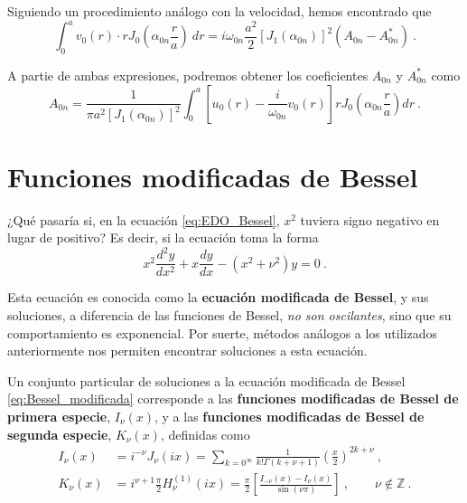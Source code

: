 \begin{ejemplo}
    Siguiendo un procedimiento análogo con la velocidad, hemos encontrado que
    \begin{equation*}
        \int_0^a v_0(r) \cdot r J_0\left( \alpha_{0n} \frac{r}{a} \right) \ dr = i \omega_{0n} \frac{a^2}{2} [J_1(\alpha_{0n})]^2 (A_{0n} - A^\ast_{0n}) \ .
    \end{equation*}

    A partie de ambas expresiones, podremos obtener los coeficientes $A_{0n}$ y $A^\ast_{0n}$ como
    \begin{equation*}
        A_{0n} = \frac{1}{\pi a^2 [J_1(\alpha_{0n})]^2} \int_0^a \left[ u_0(r) - \dfrac{i}{\omega_{0n}} v_0(r) \right] r J_0\left( \alpha_{0n} \frac{r}{a} \right) dr \ .
    \end{equation*}

\end{ejemplo}

\section{Funciones modificadas de Bessel}

¿Qué pasaría si, en la ecuación \eqref{eq:EDO_Bessel}, $x^2$ tuviera signo negativo en lugar de positivo? Es decir, si la ecuación toma la forma
\begin{equation}\label{eq:Bessel_modificada}
    x^2 \frac{d^2y}{dx^2} + x \frac{dy}{dx} - (x^2 + \nu^2)y = 0 \ . 
\end{equation}

Esta ecuación es conocida como la \textbf{ecuación modificada de Bessel}, y sus soluciones, a diferencia de las funciones de Bessel, \emph{no son oscilantes}, sino que su comportamiento es exponencial. Por suerte, métodos análogos a los utilizados anteriormente nos permiten encontrar soluciones a esta ecuación.

\begin{defi} 
    Un conjunto particular de soluciones a la ecuación modificada de Bessel \eqref{eq:Bessel_modificada} corresponde a las \textbf{funciones modificadas de Bessel de primera especie}, $I_\nu(x)$, y a las \textbf{funciones modificadas de Bessel de segunda especie}, $K_\nu(x)$, definidas como
    \begin{align}
        I_\nu(x) & = i^{-\nu} J_\nu(ix) = \sum_{k=0^\infty} \frac{1}{k! \Gamma(k+\nu+1)} \left( \frac{x}{2} \right)^{2k+\nu} \ , \\
        K_\nu(x) & = i^{\nu + 1} \frac{\pi}{2} H_\nu^{(1)}(ix) = \frac{\pi}{2} \left[ \frac{I_{-\nu}(x) - I_\nu(x)}{\sin(\nu \pi)} \right] \ , \qquad \nu \notin \mathbb{Z} \ .
    \end{align}
\end{defi}

